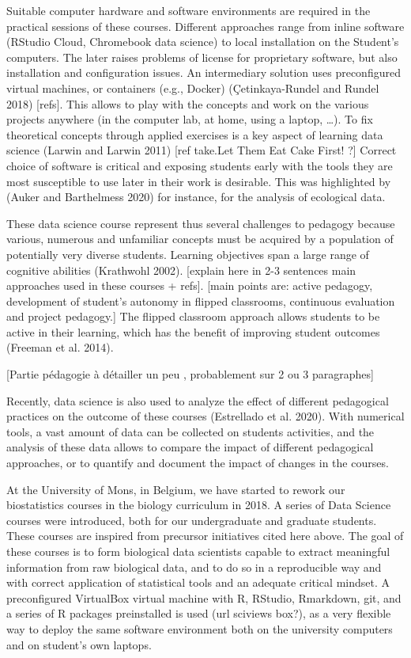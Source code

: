 \documentclass[
]{article}
\begin{document}
Suitable computer hardware and software environments are required in the
practical sessions of these courses. Different approaches range from
inline software (RStudio Cloud, Chromebook data science) to local
installation on the Student's computers. The later raises problems of
license for proprietary software, but also installation and
configuration issues. An intermediary solution uses preconfigured
virtual machines, or containers (e.g., Docker) (Çetinkaya-Rundel and
Rundel 2018) {[}refs{]}. This allows to play with the concepts and work
on the various projects anywhere (in the computer lab, at home, using a
laptop, \ldots). To fix theoretical concepts through applied exercises
is a key aspect of learning data science (Larwin and Larwin 2011) {[}ref
take.Let Them Eat Cake First! ?{]} Correct choice of software is
critical and exposing students early with the tools they are most
susceptible to use later in their work is desirable. This was
highlighted by (Auker and Barthelmess 2020) for instance, for the
analysis of ecological data.

These data science course represent thus several challenges to pedagogy
because various, numerous and unfamiliar concepts must be acquired by a
population of potentially very diverse students. Learning objectives
span a large range of cognitive abilities (Krathwohl 2002). {[}explain
here in 2-3 sentences main approaches used in these courses + refs{]}.
{[}main points are: active pedagogy, development of student's autonomy
in flipped classrooms, continuous evaluation and project pedagogy.{]}
The flipped classroom approach allows students to be active in their
learning, which has the benefit of improving student outcomes (Freeman
et al. 2014).

{[}Partie pédagogie à détailler un peu , probablement sur 2 ou 3
paragraphes{]}

Recently, data science is also used to analyze the effect of different
pedagogical practices on the outcome of these courses (Estrellado et al.
2020). With numerical tools, a vast amount of data can be collected on
students activities, and the analysis of these data allows to compare
the impact of different pedagogical approaches, or to quantify and
document the impact of changes in the courses.

At the University of Mons, in Belgium, we have started to rework our
biostatistics courses in the biology curriculum in 2018. A series of
Data Science courses were introduced, both for our undergraduate and
graduate students. These courses are inspired from precursor initiatives
cited here above. The goal of these courses is to form biological data
scientists capable to extract meaningful information from raw biological
data, and to do so in a reproducible way and with correct application of
statistical tools and an adequate critical mindset. A preconfigured
VirtualBox virtual machine with R, RStudio, Rmarkdown, git, and a series
of R packages preinstalled is used (url sciviews box?), as a very
flexible way to deploy the same software environment both on the
university computers and on student's own laptops.
\end{document}
